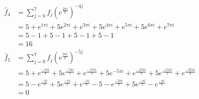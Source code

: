 \documentclass{report}
\begin{document}
\begin{solution}
\begin{enumerate}[label=(\alph*)]
\begin{align*}
			      \hat{f}_4 & = \sum_{j=0}^{7} f_{j} \left(e^{\frac{2\pi i}{8}}\right)^{-4j} \\
			                & =   5 + e^{1\pi i} + 5e^{2\pi i} + e^{3\pi i} +5 e^{4\pi i}
			      + e^{5\pi i} + 5e^{6\pi i} + e^{7\pi i} \\
			                & =  5 - 1 + 5 - 1 +5 -1  + 5 -1 \\
			                & =  16 \\
			      \hat{f}_5 & = \sum_{j=0}^{7} f_{j} \left(e^{\frac{2\pi i}{8}}\right)^{-5j} \\
			                & =   5 + e^{\frac{-5\pi i}{4}} + 5e^{\frac{-5\pi i }{2}} + e^{\frac{-15\pi i }{4}} +5 e^{-5\pi i }
			      + e^{\frac{-25\pi i}{4}} + 5e^{\frac{-15\pi i}{2}} + e^{\frac{-35\pi i}{4}} \\
			                & =  5 - e^{\frac{-\pi i}{4}} + 5e^{\frac{-\pi i }{2}} + e^{\frac{-\pi i }{4}} -5
			      - e^{\frac{-3\pi i}{4}} + 5e^{\frac{-\pi i}{2}} - e^{\frac{-\pi i}{4}} \\
			                & =  0 \\
		      \end{align*}
	\end{enumerate}
\end{solution}
\end{document}
